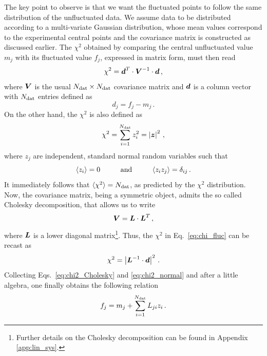 The key point to observe is that we want the fluctuated points to follow the same distribution of the unfluctuated data. We assume data to be distributed according to a multi-variate Gaussian distribution, whose mean values correspond to the experimental central points and the covariance matrix is constructed as discussed earlier. The $\chi^2$ obtained by comparing the central unfluctuated value $m_j$ with its fluctuated value $f_j$, expressed in matrix form, must then read
\begin{equation}
  \chi^2 = {\vb*{d}}^{T} \cdot \vb*{V}^{-1} \cdot \vb*{d} \,,
  \label{eq:chi_fluc}
\end{equation}
where $\vb*{V}$ is the usual $N_{\textrm{dat}} \times N_{\textrm{dat}}$ covariance matrix and $\vb*{d}$ is a column vector with $N_{\textrm{dat}}$ entries defined as
\begin{equation}
  d_j = f_j - m_j \,.
\end{equation}
On the other hand, the $\chi^2$ is also defined as
\begin{equation}
  \chi^2 = \sum_{i=1}^{N_{\textrm{dat}}} z_i^2 = \left| \vb*{z} \right|^2 \,,
  \label{eq:chi2_normal}
\end{equation}
where $z_j$ are independent, standard normal random variables such that
\begin{equation}
  \langle z_i \rangle = 0 \hspace{10mm} \T{and} \hspace{10mm}  \langle z_i z_j \rangle = \delta_{ij} \,.
\end{equation}
It immediately follows that $\langle \chi^2 \rangle = N_{\textrm{dat}}$, as predicted by the $\chi^2$ distribution. Now, the covariance matrix, being a symmetric object, admits the so called Cholesky decomposition, that allows us to write
\begin{equation}
  \vb*{V} = \vb*{L} \cdot {\vb*{L}}^{T} \,,
\end{equation}
where $\vb*{L}$ is a lower diagonal matrix\footnote{Further details on the Cholesky decomposition can be found in Appendix \ref{app:lin_sys}.}. Thus, the $\chi^2$ in Eq.~\eqref{eq:chi_fluc} can be recast as
\begin{equation}
  \chi^2 = \left| \vb*{L}^{-1} \cdot \vb*{d} \right|^2 \,.
  \label{eq:chi2_Cholesky}
\end{equation}
Collecting Eqs.~\eqref{eq:chi2_Cholesky} and \eqref{eq:chi2_normal} and after a little algebra, one finally obtains the following relation
\begin{equation}
  f_j = m_j + \sum_{i=1}^{N_{\textrm{dat}}} L_{ji} z_i\,.
  \label{eq:MC_gen}
\end{equation}
